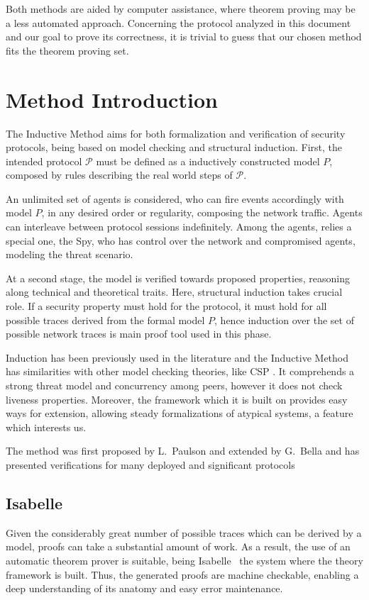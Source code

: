 Both methods are aided by computer assistance, where theorem proving may be a less automated approach. Concerning the protocol analyzed in this document and our goal to prove its correctness, it is trivial to guess that our chosen method fits the theorem proving set.





\section{Method Introduction}
The Inductive Method aims for both formalization and verification of security protocols, being based on model checking and structural induction. First, the intended protocol $\mathcal{P}$ must be defined as a inductively constructed model $P$, composed by rules describing the real world steps of $\mathcal{P}$.

An unlimited set of agents is considered, who can fire events accordingly with model $P$, in any desired order or regularity, composing the network traffic. Agents can interleave between protocol sessions indefinitely. Among the agents, relies a special one, the Spy, who has control over the network and compromised agents, modeling the threat scenario.

At a second stage, the model is verified towards proposed properties, reasoning along technical and theoretical traits. Here, structural induction takes crucial role. If a security property must hold for the protocol, it must hold for all possible traces derived from the formal model $P$, hence induction over the set of possible network traces is main proof tool used in this phase.

Induction has been previously used in the literature \cite{meadows} and the Inductive Method has similarities with other model checking theories, like CSP \cite{ryan-schneider}. It comprehends a strong threat model and concurrency among peers, however it does not check liveness properties. Moreover, the framework which it is built on provides easy ways for extension, allowing steady formalizations of atypical systems, a feature which interests us.

The method was first proposed by L.~Paulson \cite{paulson-inductive} and extended by G.~Bella \cite{bella-book} and has presented verifications for many deployed and significant protocols \cite{inductive-on-tls} %



\subsection{Isabelle}
Given the considerably great number of possible traces which can be derived by a model, proofs can take a substantial amount of work. As a result, the use of an automatic theorem prover is suitable, being Isabelle~\cite{isabelle} the system where the theory framework is built. Thus, the generated proofs are machine checkable, enabling a deep understanding of its anatomy and easy error maintenance.

